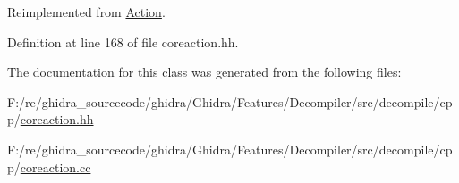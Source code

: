 Reimplemented from \mbox{\hyperlink{class_action_ac7c1cf16bb63e0741ba16be5179cf943}{Action}}.



Definition at line 168 of file coreaction.\+hh.



The documentation for this class was generated from the following files\+:\begin{DoxyCompactItemize}
\item 
F\+:/re/ghidra\+\_\+sourcecode/ghidra/\+Ghidra/\+Features/\+Decompiler/src/decompile/cpp/\mbox{\hyperlink{coreaction_8hh}{coreaction.\+hh}}\item 
F\+:/re/ghidra\+\_\+sourcecode/ghidra/\+Ghidra/\+Features/\+Decompiler/src/decompile/cpp/\mbox{\hyperlink{coreaction_8cc}{coreaction.\+cc}}\end{DoxyCompactItemize}
